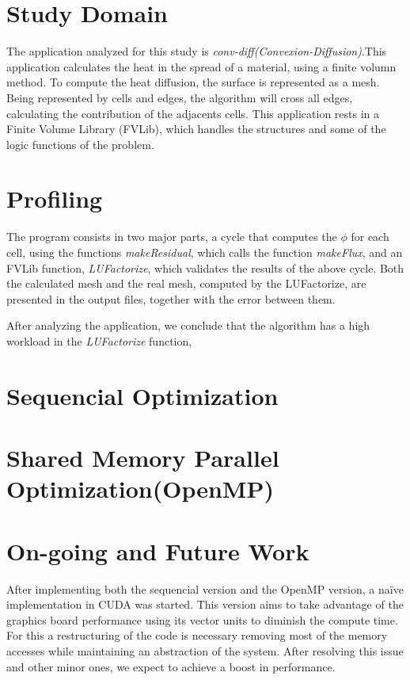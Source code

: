 \documentclass[a4paper,10pt,openright,openbib,twocolumn]{article}
\begin{document}
\section{Study Domain}    %

The application analyzed for this study is \emph{conv-diff(Convexion-Diffusion)}.This application calculates the heat in the spread of a material, using a finite volumn method. To compute the heat diffusion, the surface is represented as a mesh. Being represented by cells and edges, the algorithm will cross all edges, calculating the contribution of the adjacents cells. This application rests in a Finite Volume Library (FVLib), which handles the structures and some of the logic functions of the problem.


\section{Profiling}    %

The program consists in two major parts, a cycle that computes the $\phi$ for each cell, using the functions \emph{makeResidual}, which calls the function \emph{makeFlux}, and an FVLib function, \emph{LUFactorize}, which validates the results of the above cycle. Both the calculated mesh and the real mesh, computed by the LUFactorize, are presented in the output files, together with the error between them.
 
After analyzing the application, we conclude that the algorithm has a high workload in the \emph{LUFactorize} function,


\section{Sequencial Optimization}


\section{Shared Memory Parallel Optimization(OpenMP)}


\section{On-going and Future Work}    %

After implementing both the sequencial version and the OpenMP version, a na\"{i}ve implementation in CUDA was started. This version aims to take advantage of the graphics board performance using its vector units to diminish the compute time. For this a restructuring of the code is necessary removing most of the memory accesses while maintaining an abstraction of the system. After resolving this issue and other minor ones, we expect to achieve a boost in performance.
\end{document}
